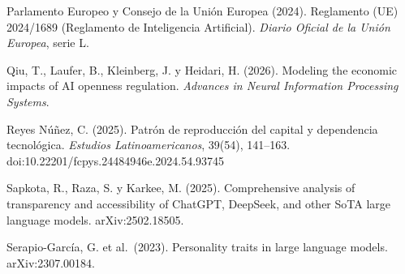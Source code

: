 \documentclass[11pt]{article}
\begin{document}
Parlamento Europeo y Consejo de la Unión Europea (2024). Reglamento (UE) 2024/1689 (Reglamento de Inteligencia Artificial). \textit{Diario Oficial de la Unión Europea}, serie L.

Qiu, T., Laufer, B., Kleinberg, J. y Heidari, H. (2026). Modeling the economic impacts of AI openness regulation. \textit{Advances in Neural Information Processing Systems}.

Reyes Núñez, C. (2025). Patrón de reproducción del capital y dependencia tecnológica. \textit{Estudios Latinoamericanos}, 39(54), 141--163. doi:10.22201/fcpys.24484946e.2024.54.93745

Sapkota, R., Raza, S. y Karkee, M. (2025). Comprehensive analysis of transparency and accessibility of ChatGPT, DeepSeek, and other SoTA large language models. arXiv:2502.18505.

Serapio-García, G. et al.\ (2023). Personality traits in large language models. arXiv:2307.00184.

\endgroup
\end{document}
